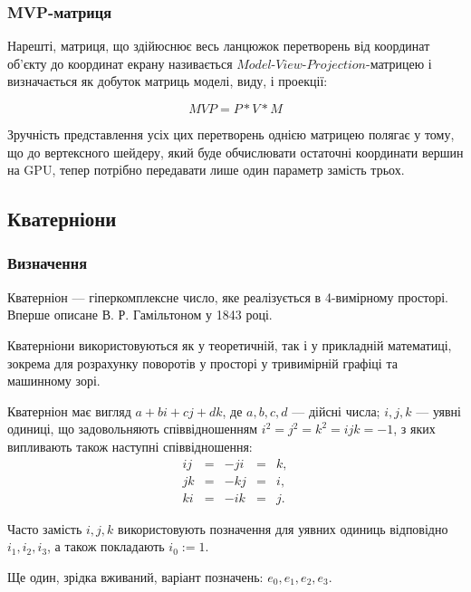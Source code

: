 \subsubsection{MVP-матриця}

Нарешті, матриця, що здійюснює весь ланцюжок перетворень від координат об'єкту до координат екрану називається $\textit{Model-View-Projection}$-матрицею і визначається як добуток матриць моделі, виду, і проекції:

\begin{equation}
  \mathit{MVP} = P*V*M
\end{equation}

Зручність представлення усіх цих перетворень однією матрицею полягає у тому, що до вертексного шейдеру, який буде обчислювати остаточні координати вершин на GPU, тепер потрібно передавати лише один параметр замість трьох.

\subsection{Кватерніони}

\subsubsection{Визначення}

Кватерніон  — гіперкомплексне число, яке реалізується в 4-вимірному просторі. Вперше описане В. Р. Гамільтоном у 1843 році.

Кватерніони використовуються як у теоретичній, так і у прикладній математиці, зокрема для розрахунку поворотів у просторі у тривимірній графіці та машинному зорі.

Кватерніон має вигляд $a + bi + cj + dk$, де $a, b, c, d$ — дійсні числа;
$i, j, k$ — уявні одиниці, що задовольняють співвідношенням
$i^2 = j^2 = k^2 = ijk = -1$, з яких випливають також наступні співвідношення: \\
\begin{equation}
  \begin{matrix}
    ij & = & -ji & = & k, \\
    jk & = & -kj & = & i, \\
    ki & = & -ik & = & j.
  \end{matrix}
\end{equation}

Часто замість $i, j, k$ використовують позначення для уявних одиниць відповідно $i_1, i_2, i_3$, а також покладають $i_0 := 1$.

Ще один, зрідка вживаний, варіант позначень: $e_0, e_1, e_2, e_3$.


